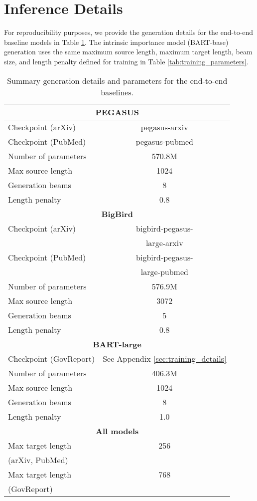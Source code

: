 \documentclass[11pt,table]{article}
\begin{document}
\section{Inference Details}
\label{sec:inference_details}
For reproducibility purposes, we provide the generation details for the end-to-end baseline models in Table \ref{tab:baseline_generation_parameters}. The intrinsic importance model (BART-base) generation uses the same maximum source length, maximum target length, beam size, and length penalty defined for training in Table \ref{tab:training_parameters}.

\begin{table}
  \centering
  \setlength\tabcolsep{2.9pt}
  \begin{tabular}{lc}
    \toprule
    \multicolumn{2}{c}{\textbf{PEGASUS}} \\
    \midrule
    Checkpoint (arXiv) & pegasus-arxiv\\ Checkpoint (PubMed) & pegasus-pubmed\\ Number of parameters & 570.8M \\
    Max source length & 1024 \\
    Generation beams & 8 \\
    Length penalty & 0.8 \\  
    \midrule
    \multicolumn{2}{c}{\textbf{BigBird}} \\
    \midrule
    Checkpoint (arXiv) & bigbird-pegasus-\\
    & large-arxiv\\ Checkpoint (PubMed) & bigbird-pegasus-\\
    & large-pubmed\\ Number of parameters & 576.9M \\
    Max source length & 3072 \\
    Generation beams & 5 \\
    Length penalty & 0.8 \\
    \midrule
    \multicolumn{2}{c}{\textbf{BART-large}} \\
    \midrule
    Checkpoint (GovReport) & See Appendix \ref{sec:training_details} \\ 
    Number of parameters & 406.3M \\
    Max source length & 1024 \\
    Generation beams & 8 \\
    Length penalty & 1.0 \\
    \midrule
    \multicolumn{2}{c}{\textbf{All models}} \\
    \midrule
    Max target length & 256 \\
    (arXiv, PubMed) & \\
    Max target length & 768 \\
    (GovReport) & \\
    \bottomrule
  \end{tabular}
  \caption{Summary generation details and parameters for the end-to-end baselines.}\label{tab:baseline_generation_parameters}
\end{table}
\end{document}
